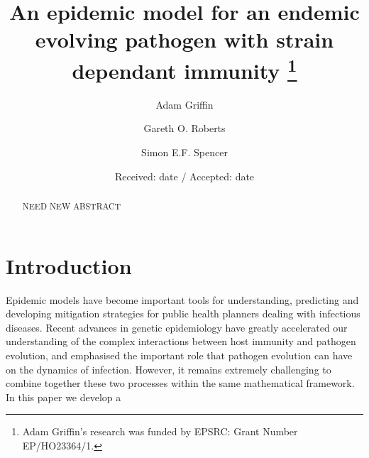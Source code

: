 \documentclass[smallextended]{svjour3}       %
\begin{document}
\title{An epidemic model for an endemic evolving pathogen with strain dependant immunity
\thanks{ Adam Griffin's research was funded by EPSRC: Grant Number EP/HO23364/1. }
}
%



\author{Adam Griffin         \and
        Gareth O. Roberts 			\and
        Simon E.F. Spencer%
}



\date{Received: date / Accepted: date}

\maketitle

\begin{abstract}

NEED NEW ABSTRACT

\end{abstract}

\section{Introduction}

Epidemic models have become important tools for understanding, predicting and developing mitigation strategies for public health planners dealing with infectious diseases. Recent advances in genetic epidemiology have greatly accelerated our understanding of the complex interactions between host immunity and pathogen evolution, and emphasised the important role that pathogen evolution can have on the dynamics of infection. However, it remains extremely challenging to combine together these two processes within the same mathematical framework. In this paper we develop a  
\end{document}
